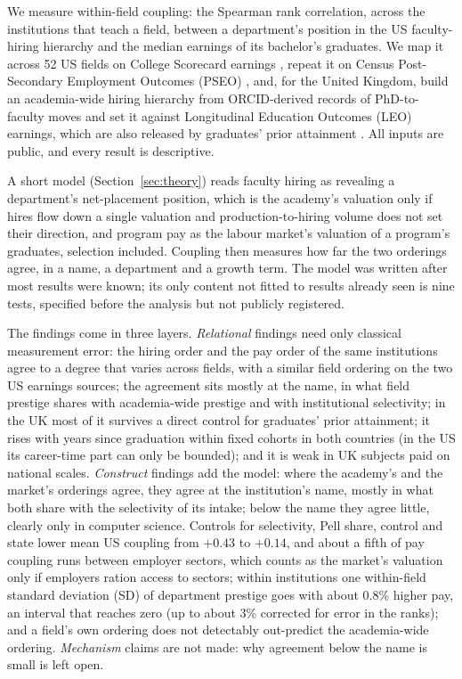 \documentclass[11pt]{article}
\begin{document}
We measure within-field coupling: the Spearman rank correlation, across the institutions that teach a field,
between a department's position in the US faculty-hiring hierarchy \citep{wapman2022quantifying} and the median
earnings of its bachelor's graduates. We map it across 52 US fields on College Scorecard earnings
\citep{scorecard}, repeat it on Census Post-Secondary Employment Outcomes (PSEO) \citep{pseo, pseo2026}, and, for
the United Kingdom, build an academia-wide hiring hierarchy from ORCID-derived records of PhD-to-faculty moves
\citep{li2026orcid} and set it against Longitudinal Education Outcomes (LEO) earnings, which are also released by
graduates' prior attainment \citep{dfe_leo_provider}. All inputs are public, and every result is descriptive.

A short model (Section~\ref{sec:theory}) reads faculty hiring as revealing a department's net-placement
position, which is the academy's valuation only if hires flow down a single valuation and production-to-hiring
volume does not set their direction, and program pay as the labour market's valuation of a program's graduates,
selection included. Coupling
then measures how far the two orderings agree, in a name, a department and a growth term. The model was written
after most results were known; its only content not fitted to results already seen is nine tests, specified before
the analysis but not publicly registered.

The findings come in three layers. \emph{Relational} findings need only classical measurement error: the hiring
order and the pay order of the same institutions agree to a degree that varies across fields, with a similar field
ordering on the two US earnings sources; the agreement sits mostly at the name, in what field prestige shares with
academia-wide prestige and with institutional selectivity; in the UK most of it survives a direct control for
graduates' prior attainment; it rises with years since graduation within fixed cohorts in both countries (in the US
its career-time part can only be bounded); and it is weak in UK subjects paid on national scales.
\emph{Construct} findings add the model: where the academy's and the market's orderings agree, they agree at the
institution's name, mostly in what both share with the selectivity of its intake; below the name they agree little,
clearly only in computer science. Controls for selectivity, Pell share, control and state lower mean US coupling
from $+0.43$ to $+0.14$, and about a fifth of pay coupling runs between employer sectors, which counts as the
market's valuation only if employers ration access to sectors; within institutions one within-field standard
deviation (SD) of department prestige goes with about 0.8\% higher pay, an interval that reaches zero (up to about
3\% corrected for error in the ranks); and a field's own ordering does not detectably out-predict the academia-wide
ordering. \emph{Mechanism} claims are not made: why agreement below the name is small is left open.
\end{document}
